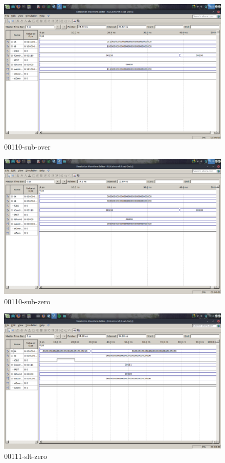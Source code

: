 \documentclass[12pt]{article}
\begin{document}
\begin{figure}[H]
	\centering
	\includegraphics[width=.8\textwidth]{00110-sub-over.png}
	\caption{00110-sub-over}
	\label{fig:00110-sub-over}
\end{figure}

\begin{figure}[H]
	\centering
	\includegraphics[width=.8\textwidth]{00110-sub-zero.png}
	\caption{00110-sub-zero}
	\label{fig:00110-sub-zero}
\end{figure}

\begin{figure}[H]
	\centering
	\includegraphics[width=.8\textwidth]{00111-slt-zero.png}
	\caption{00111-slt-zero}
	\label{fig:00111-slt-zero}
\end{figure}
\end{document}
